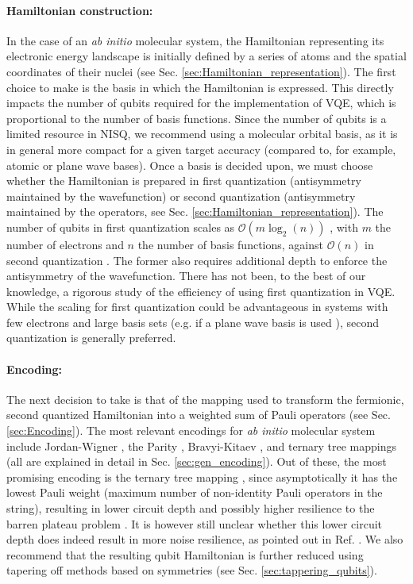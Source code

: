 \paragraph{Hamiltonian construction:} In the case of an \textit{ab initio} molecular system, the Hamiltonian representing its electronic energy landscape is initially defined by a series of atoms and the spatial coordinates of their nuclei (see Sec. \ref{sec:Hamiltonian_representation}). The first choice to make is the basis in which the Hamiltonian is expressed. This directly impacts the number of qubits required for the implementation of VQE, which is proportional to the number of basis functions. Since the number of qubits is a limited resource in NISQ, we recommend using a molecular orbital basis, as it is in general more compact for a given target accuracy (compared to, for example, atomic or plane wave bases). Once a basis is decided upon, we must choose whether the Hamiltonian is prepared in first quantization (antisymmetry maintained by the wavefunction) or second quantization (antisymmetry maintained by the operators, see Sec. \ref{sec:Hamiltonian_representation}). The number of qubits in first quantization scales as $\mathcal{O}(m\log_2(n))$ \cite{Abrams1997, Berry2018}, with $m$ the number of electrons and $n$ the number of basis functions, against $\mathcal{O}(n)$ in second quantization \cite{Jordan1928}. The former also requires additional depth to enforce the antisymmetry of the wavefunction. There has not been, to the best of our knowledge, a rigorous study of the efficiency of using first quantization in VQE. While the scaling for first quantization could be advantageous in systems with few electrons and large basis sets (e.g. if a plane wave basis is used \cite{Babbush2018}), second quantization is generally preferred. 

\paragraph{Encoding:} The next decision to take is that of the mapping used to transform the fermionic, second quantized Hamiltonian into a weighted sum of Pauli operators (see Sec. \ref{sec:Encoding}). The most relevant encodings for \textit{ab initio} molecular system include Jordan-Wigner \cite{Jordan1928}, the Parity \cite{Seeley2012}, Bravyi-Kitaev \cite{Bravyi2002, Seeley2012, Tranter2015}, and ternary tree mappings \cite{Jiang2020} (all are explained in detail in Sec. \ref{sec:gen_encoding}). Out of these, the most promising encoding is the ternary tree mapping \cite{Jiang2020}, since asymptotically it has the lowest Pauli weight (maximum number of non-identity Pauli operators in the string), resulting in lower circuit depth and possibly higher resilience to the barren plateau problem \cite{Cerezo2021_BP, Uvarov2020}. It is however still unclear whether this lower circuit depth does indeed result in more noise resilience, as pointed out in Ref. \cite{Sawaya2016}. We also recommend that the resulting qubit Hamiltonian is further reduced using tapering off methods based on symmetries \cite{bravyi_tapering_2017, Setia2020, Kirby2021_CSVQE} (see Sec. \ref{sec:tappering_qubits}).

